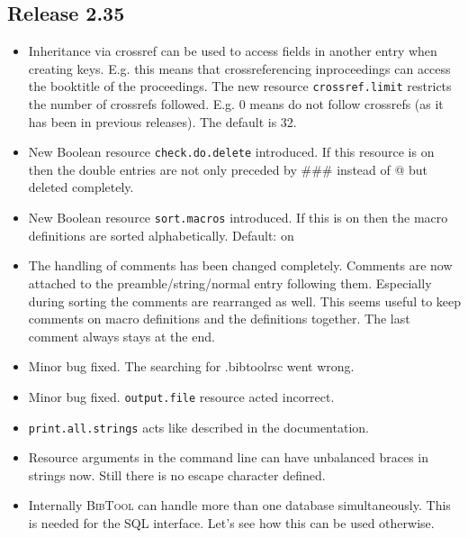\documentclass[11pt,a4paper]{scrartcl}
\newcommand\rsc[1]{\texttt{#1}}
\newcommand\File[1]{\textsf{#1}}
\newcommand\BibTool{\textsc{BibTool}}
\newenvironment{Release}[2]{%
  \def\tmp{#2}%
  \section*{Release #1 \ifx\tmp\empty\else{\normalsize[#2]}\fi}
  \begin{itemize}
}{\end{itemize}}
\newenvironment{Fix}[1]{\item }{}
\newenvironment{New}[1]{\item }{}
\newenvironment{Update}[1]{\item }{}
\begin{document}
\begin{multicols}
 \begin{Release}{2.35}{}
  \begin{Update}{gene}
    Inheritance via crossref can be used to access fields in another
    entry when creating keys. E.g. this means that crossreferencing
    inproceedings can access the booktitle of the proceedings. The new
    resource \rsc{crossref.limit} restricts the number of crossrefs
    followed. E.g. 0 means do not follow crossrefs (as it has been in
    previous releases). The default is 32.
  \end{Update}
  \begin{New}{gene}
    New Boolean resource \rsc{check.do.delete} introduced. If this
    resource is on then the double entries are not only preceded by
    \#\#\# instead of @ but deleted completely.
  \end{New}
  \begin{New}{gene}
    New Boolean resource \rsc{sort.macros} introduced. If this is on
    then the macro definitions are sorted alphabetically. Default: on
  \end{New}
  \begin{Update}{gene}
    The handling of comments has been changed completely. Comments are
    now attached to the preamble/string/normal entry following them.
    Especially during sorting the comments are rearranged as well.
    This seems useful to keep comments on macro definitions and the
    definitions together. The last comment always stays at the end.
  \end{Update}
  \begin{Fix}{gene}
    Minor bug fixed. The searching for \File{.bibtoolrsc} went wrong.
  \end{Fix}
  \begin{Fix}{gene}
    Minor bug fixed. \rsc{output.file} resource acted incorrect.
  \end{Fix}
  \begin{New}{gene}
    \rsc{print.all.strings} acts like described in the documentation.
  \end{New}
  \begin{Update}{gene}
    Resource arguments in the command line can have unbalanced braces in
    strings now. Still there is no escape character defined.
  \end{Update}
  \begin{Update}{gene}
    Internally \BibTool{} can handle more than one database simultaneously.
    This is needed for the SQL interface. Let's see how this can be used
    otherwise.
  \end{Update}
 \end{Release}


\end{multicols}
\end{document}
